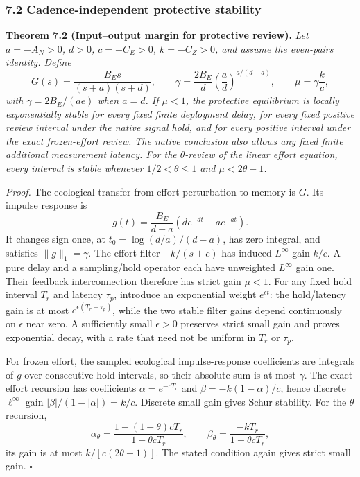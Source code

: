 \subsubsection{7.2 Cadence-independent protective stability}

\textbf{Theorem 7.2 (Input--output margin for protective review).}
\emph{Let $a=-A_N>0$, $d>0$, $c=-C_E>0$, $k=-C_Z>0$, and assume the even-pairs identity. Define}
\[
G(s)=\frac{B_Es}{(s+a)(s+d)},\qquad
\gamma=\frac{2B_E}{d}\left(\frac{a}{d}\right)^{a/(d-a)},\qquad \mu=\gamma\frac{k}{c},
\]
\emph{with $\gamma=2B_E/(ae)$ when $a=d$. If $\mu<1$, the protective equilibrium is locally exponentially stable for every fixed finite deployment delay, for every fixed positive review interval under the native signal hold, and for every positive interval under the exact frozen-effort review. The native conclusion also allows any fixed finite additional measurement latency. For the $\theta$-review of the linear effort equation, every interval is stable whenever $1/2<\theta\le1$ and $\mu<2\theta-1$.}

\emph{Proof.} The ecological transfer from effort perturbation to memory is $G$. Its impulse response is
\[
g(t)=\frac{B_E}{d-a}\left(de^{-dt}-ae^{-at}\right).
\]
It changes sign once, at $t_0=\log(d/a)/(d-a)$, has zero integral, and satisfies $\|g\|_1=\gamma$. The effort filter $-k/(s+c)$ has induced $L^\infty$ gain $k/c$. A pure delay and a sampling/hold operator each have unweighted $L^\infty$ gain one. Their feedback interconnection therefore has strict gain $\mu<1$. For any fixed hold interval $T_r$ and latency $\tau_p$, introduce an exponential weight $e^{\epsilon t}$: the hold/latency gain is at most $e^{\epsilon(T_r+\tau_p)}$, while the two stable filter gains depend continuously on $\epsilon$ near zero. A sufficiently small $\epsilon>0$ preserves strict small gain and proves exponential decay, with a rate that need not be uniform in $T_r$ or $\tau_p$.

For frozen effort, the sampled ecological impulse-response coefficients are integrals of $g$ over consecutive hold intervals, so their absolute sum is at most $\gamma$. The exact effort recursion has coefficients $\alpha=e^{-cT_r}$ and $\beta=-k(1-\alpha)/c$, hence discrete $\ell^\infty$ gain $|\beta|/(1-|\alpha|)=k/c$. Discrete small gain gives Schur stability. For the $\theta$ recursion,
\[
\alpha_\theta=\frac{1-(1-\theta)cT_r}{1+\theta cT_r},\qquad
\beta_\theta=\frac{-kT_r}{1+\theta cT_r},
\]
its gain is at most $k/[c(2\theta-1)]$. The stated condition again gives strict small gain. \ensuremath{\square}

